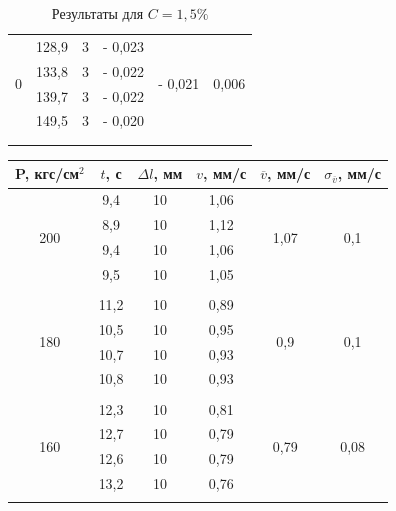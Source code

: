 \documentclass[a4paper, 12pt]{article}%
\begin{document}
\begin{enumerate}
\begin{longtable} {|c|c|c|c|c|c|}
		
		\multirow{4}{*}{0}& 128,9 & 3 & - 0,023 &  \multirow{4}{*}{- 0,021}    & \multirow{4}{*}{0,006}\\ \cline{2-4}
		& 133,8 & 3 &    - 0,022         &               &\\ \cline{2-4}
		& 139,7 & 3 &    - 0,022         &              & \\ \cline{2-4}
		& 149,5 & 3 &   - 0,020           &             &\\ \hline
		&&&&&\\ \hline
		\caption{Результаты для $ C = 1,5\% $  }
	\end{longtable}
	
	
	\newpage
	
	
		\begin{longtable} {|c|c|c|c|c|c|}
		\hline
		P, кгс/см$^2$ & $ t $, с &   $ \Delta l$, мм  & $v$,  мм/с   & $\overline v $, мм/с & $\sigma_{\overline v}$, мм/с\\ \hline
		\multirow{4}{*}{200}& 9,4 & 10 & 1,06 &  \multirow{4}{*}{1,07}    & \multirow{4}{*}{0,1}\\ \cline{2-4}
		& 8,9 & 10 &   1,12         &               &\\ \cline{2-4}
		& 9,4 & 10 &     1,06         &              & \\ \cline{2-4}
		& 9,5 & 10 &    1,05           &             &\\ \hline
		&&&&&\\ \hline
		
		\multirow{4}{*}{180}& 11,2 & 10 & 0,89 &  \multirow{4}{*}{0,9}    & \multirow{4}{*}{0,1}\\ \cline{2-4}
		& 10,5 & 10 &    0,95         &               &\\ \cline{2-4}
		& 10,7 & 10 &     0,93         &              & \\ \cline{2-4}
		& 10,8 & 10 &    0,93           &             &\\ \hline
		&&&&&\\ \hline
		
		\multirow{4}{*}{160}& 12,3 & 10 & 0,81 &  \multirow{4}{*}{0,79}    & \multirow{4}{*}{0,08}\\ \cline{2-4}
		& 12,7 & 10 &    0,79         &               &\\ \cline{2-4}
		& 12,6 & 10 &     0,79         &              & \\ \cline{2-4}
		& 13,2 & 10 &    0,76           &             &\\ \hline
		&&&&&\\ \hline
		

\end{longtable}
\end{enumerate}
\end{document}
